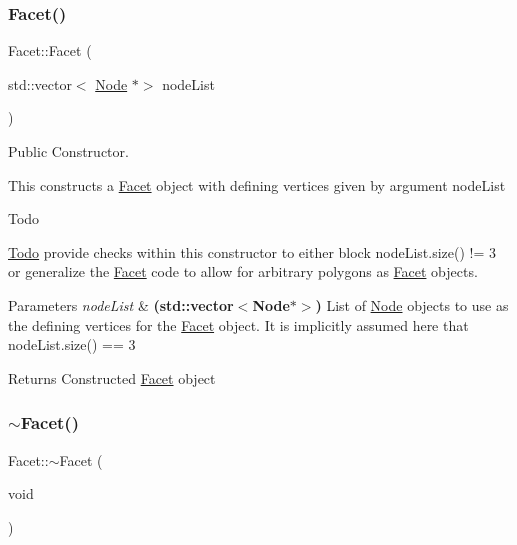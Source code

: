 \subsubsection{\texorpdfstring{Facet()}{Facet()}\hspace{0.1cm}{\footnotesize\ttfamily [2/2]}}
{\footnotesize\ttfamily Facet\+::\+Facet (\begin{DoxyParamCaption}\item[{std\+::vector$<$ \mbox{\hyperlink{class_node}{Node}} $\ast$$>$}]{node\+List }\end{DoxyParamCaption})}



Public Constructor. 

This constructs a \mbox{\hyperlink{class_facet}{Facet}} object with defining vertices given by argument node\+List \begin{DoxyRefDesc}{Todo}
\item[\mbox{\hyperlink{todo__todo000009}{Todo}}]provide checks within this constructor to either block node\+List.\+size() != 3 or generalize the \mbox{\hyperlink{class_facet}{Facet}} code to allow for arbitrary polygons as \mbox{\hyperlink{class_facet}{Facet}} objects. \end{DoxyRefDesc}

\begin{DoxyParams}{Parameters}
{\em node\+List} & {\bfseries (std\+::vector$<$\+Node$\ast$$>$)} List of \mbox{\hyperlink{class_node}{Node}} objects to use as the defining vertices for the \mbox{\hyperlink{class_facet}{Facet}} object. It is implicitly assumed here that node\+List.\+size() == 3 \\
\hline
\end{DoxyParams}
\begin{DoxyReturn}{Returns}
Constructed \mbox{\hyperlink{class_facet}{Facet}} object 
\end{DoxyReturn}
\mbox{\label{class_facet_a03f21d37a4b9d63a63a9dc0f76b22d15}} 
\subsubsection{\texorpdfstring{$\sim$\+Facet()}{~Facet()}}
{\footnotesize\ttfamily Facet\+::$\sim$\+Facet (\begin{DoxyParamCaption}\item[{void}]{ }\end{DoxyParamCaption})\hspace{0.3cm}{\ttfamily [virtual]}}



